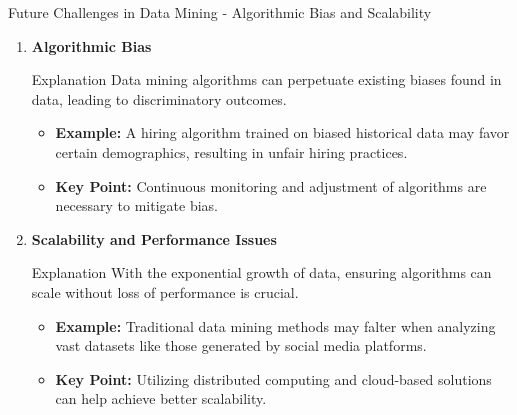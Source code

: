 \documentclass[aspectratio=169]{beamer}
\begin{document}
\begin{frame}[fragile]{Future Challenges in Data Mining - Algorithmic Bias and Scalability}
    \begin{enumerate}
        \item \textbf{Algorithmic Bias}
        \begin{block}{Explanation}
            Data mining algorithms can perpetuate existing biases found in data, leading to discriminatory outcomes.
        \end{block}
        \begin{itemize}
            \item \textbf{Example:} A hiring algorithm trained on biased historical data may favor certain demographics, resulting in unfair hiring practices.
            \item \textbf{Key Point:} Continuous monitoring and adjustment of algorithms are necessary to mitigate bias.
        \end{itemize}

        \item \textbf{Scalability and Performance Issues}
        \begin{block}{Explanation}
            With the exponential growth of data, ensuring algorithms can scale without loss of performance is crucial.
        \end{block}
        \begin{itemize}
            \item \textbf{Example:} Traditional data mining methods may falter when analyzing vast datasets like those generated by social media platforms.
            \item \textbf{Key Point:} Utilizing distributed computing and cloud-based solutions can help achieve better scalability.
        \end{itemize}
    \end{enumerate}
\end{frame}
\end{document}
